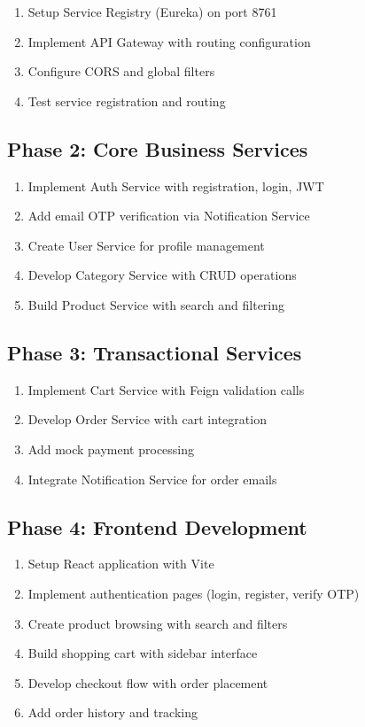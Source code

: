 \begin{enumerate}
    \item Setup Service Registry (Eureka) on port 8761
    \item Implement API Gateway with routing configuration
    \item Configure CORS and global filters
    \item Test service registration and routing
\end{enumerate}

\subsection{Phase 2: Core Business Services}

\begin{enumerate}
    \item Implement Auth Service with registration, login, JWT
    \item Add email OTP verification via Notification Service
    \item Create User Service for profile management
    \item Develop Category Service with CRUD operations
    \item Build Product Service with search and filtering
\end{enumerate}

\subsection{Phase 3: Transactional Services}

\begin{enumerate}
    \item Implement Cart Service with Feign validation calls
    \item Develop Order Service with cart integration
    \item Add mock payment processing
    \item Integrate Notification Service for order emails
\end{enumerate}

\subsection{Phase 4: Frontend Development}

\begin{enumerate}
    \item Setup React application with Vite
    \item Implement authentication pages (login, register, verify OTP)
    \item Create product browsing with search and filters
    \item Build shopping cart with sidebar interface
    \item Develop checkout flow with order placement
    \item Add order history and tracking
\end{enumerate}

